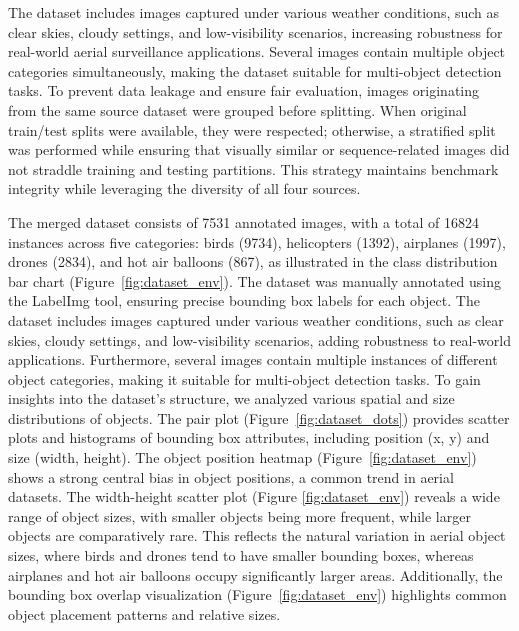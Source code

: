 \documentclass[preprint,review,12pt]{elsarticle}
\begin{document}
The dataset includes images captured under various weather conditions, such as clear skies, cloudy settings, and low-visibility scenarios, increasing robustness for real-world aerial surveillance applications. Several images contain multiple object categories simultaneously, making the dataset suitable for multi-object detection tasks.
To prevent data leakage and ensure fair evaluation, images originating from the same source dataset were grouped before splitting. When original train/test splits were available, they were respected; otherwise, a stratified split was performed while ensuring that visually similar or sequence-related images did not straddle training and testing partitions. This strategy maintains benchmark integrity while leveraging the diversity of all four sources.

The merged dataset consists of 7531 annotated images, with a total of 16824 instances across five categories: birds (9734), helicopters (1392), airplanes (1997), drones (2834), and hot air balloons (867), as illustrated in the class distribution bar chart (Figure~\ref{fig:dataset_env}). The dataset was manually annotated using the LabelImg tool, ensuring precise bounding box labels for each object\cite{tzutalin2015labelimg}. The dataset includes images captured under various weather conditions, such as clear skies, cloudy settings, and low-visibility scenarios, adding robustness to real-world applications. Furthermore, several images contain multiple instances of different object categories, making it suitable for multi-object detection tasks.
To gain insights into the dataset's structure, we analyzed various spatial and size distributions of objects. 
The pair plot (Figure~\ref{fig:dataset_dots}) provides scatter plots and histograms of bounding box attributes, including position (x, y) and size (width, height). 
The object position heatmap (Figure~\ref{fig:dataset_env}) shows a strong central bias in object positions, a common trend in aerial datasets. The width-height scatter plot (Figure \ref{fig:dataset_env}) reveals a wide range of object sizes, with smaller objects being more frequent, while larger objects are comparatively rare. This reflects the natural variation in aerial object sizes, where birds and drones tend to have smaller bounding boxes, whereas airplanes and hot air balloons occupy significantly larger areas.
Additionally, the bounding box overlap visualization (Figure~\ref{fig:dataset_env}) highlights common object placement patterns and relative sizes.
\end{document}
